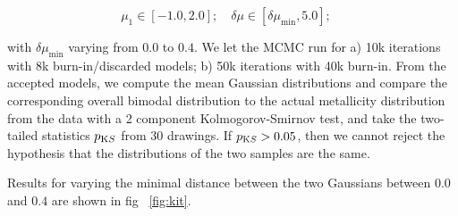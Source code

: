 \begin{equation} \mu_1\in[-1.0,2.0];\quad \delta \mu \in [
\delta\mu_{\min}, 5.0];\quad
\end{equation}

with $\delta\mu_{\min}$ varying from $0.0$ to $0.4$. We let the MCMC
run for a) 10k iterations with 8k burn-in/discarded models; b) 50k
iterations with 40k burn-in. From the accepted models, we compute the
mean Gaussian distributions and compare the corresponding overall
bimodal distribution to the actual metallicity distribution from the
data with a 2 component Kolmogorov-Smirnov test, and take the
two-tailed statistics $p_{\text KS}$ from 30 drawings. If $p_{\text
KS}>0.05$, then we cannot reject the hypothesis that the distributions
of the two samples are the same.

Results for varying the minimal distance between the two Gaussians
between $0.0$ and $0.4$ are shown in fig ~\ref{fig:kit}.


